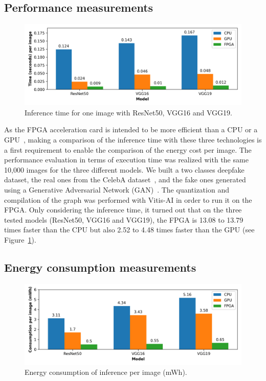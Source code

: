 \subsection{Performance measurements}

\begin{figure}[t]
\centering
\includegraphics[width=\columnwidth]{5_Chapitre3/figures/characterization/time_of_inference_1_image.png}
\caption{Inference time for one image with ResNet50, VGG16 and VGG19.}
\label{figure:herofake-time-inference}
\end{figure}

As the FPGA acceleration card is intended to be more efficient than a CPU or a GPU~\cite{5272532}, making a comparison of the inference time with these three technologies is a first requirement to enable the comparison of the energy cost per image. The performance evaluation in terms of execution time was realized with the same 10,000 images for the three different models. We built a two classes deepfake dataset, the real ones from the CelebA dataset~\cite{https://doi.org/10.48550/arxiv.1411.7766}, and the fake ones generated using a Generative Adversarial Network (GAN)~\cite{jimaging7080128}. The quantization and compilation of the graph was performed with Vitis-AI in order to run it on the FPGA. Only considering the inference time, it turned out that on the three tested models (ResNet50, VGG16 and VGG19), the FPGA is 13.08 to 13.79 times faster than the CPU but also 2.52 to 4.48 times faster than the GPU (see Figure~\ref{figure:herofake-time-inference}).

\subsection{Energy consumption measurements}

\begin{figure}[t]
\centering
\includegraphics[width=\columnwidth]{5_Chapitre3/figures/characterization/consumption_per_image.png}
\caption{Energy consumption of inference per image (mWh).}
\label{figure:herofake-consumption-per-image}
\end{figure}

